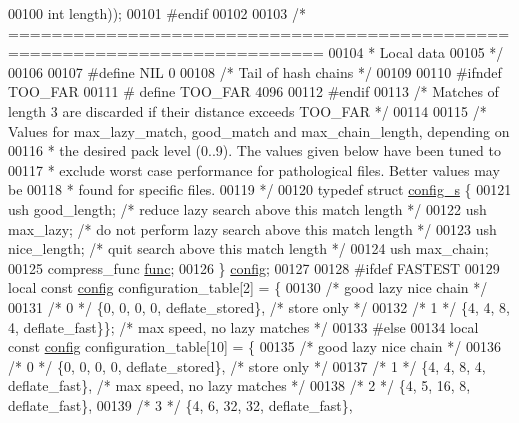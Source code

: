 \begin{DoxyCode}
00100                             \textcolor{keywordtype}{int} length));
00101 \textcolor{preprocessor}{#endif}
00102 
00103 \textcolor{comment}{/* ===========================================================================}
00104 \textcolor{comment}{ * Local data}
00105 \textcolor{comment}{ */}
00106 
00107 \textcolor{preprocessor}{#define NIL 0}
00108 \textcolor{comment}{/* Tail of hash chains */}
00109 
00110 \textcolor{preprocessor}{#ifndef TOO\_FAR}
00111 \textcolor{preprocessor}{#  define TOO\_FAR 4096}
00112 \textcolor{preprocessor}{#endif}
00113 \textcolor{comment}{/* Matches of length 3 are discarded if their distance exceeds TOO\_FAR */}
00114 
00115 \textcolor{comment}{/* Values for max\_lazy\_match, good\_match and max\_chain\_length, depending on}
00116 \textcolor{comment}{ * the desired pack level (0..9). The values given below have been tuned to}
00117 \textcolor{comment}{ * exclude worst case performance for pathological files. Better values may be}
00118 \textcolor{comment}{ * found for specific files.}
00119 \textcolor{comment}{ */}
00120 \textcolor{keyword}{typedef} \textcolor{keyword}{struct }\hyperlink{structconfig__s}{config\_s} \{
00121    ush good\_length; \textcolor{comment}{/* reduce lazy search above this match length */}
00122    ush max\_lazy;    \textcolor{comment}{/* do not perform lazy search above this match length */}
00123    ush nice\_length; \textcolor{comment}{/* quit search above this match length */}
00124    ush max\_chain;
00125    compress\_func \hyperlink{structfunc}{func};
00126 \} \hyperlink{structconfig__s}{config};
00127 
00128 \textcolor{preprocessor}{#ifdef FASTEST}
00129 local \textcolor{keyword}{const} \hyperlink{structconfig__s}{config} configuration\_table[2] = \{
00130 \textcolor{comment}{/*      good lazy nice chain */}
00131 \textcolor{comment}{/* 0 */} \{0,    0,  0,    0, deflate\_stored\},  \textcolor{comment}{/* store only */}
00132 \textcolor{comment}{/* 1 */} \{4,    4,  8,    4, deflate\_fast\}\}; \textcolor{comment}{/* max speed, no lazy matches */}
00133 \textcolor{preprocessor}{#else}
00134 local \textcolor{keyword}{const} \hyperlink{structconfig__s}{config} configuration\_table[10] = \{
00135 \textcolor{comment}{/*      good lazy nice chain */}
00136 \textcolor{comment}{/* 0 */} \{0,    0,  0,    0, deflate\_stored\},  \textcolor{comment}{/* store only */}
00137 \textcolor{comment}{/* 1 */} \{4,    4,  8,    4, deflate\_fast\}, \textcolor{comment}{/* max speed, no lazy matches */}
00138 \textcolor{comment}{/* 2 */} \{4,    5, 16,    8, deflate\_fast\},
00139 \textcolor{comment}{/* 3 */} \{4,    6, 32,   32, deflate\_fast\},

\end{DoxyCode}

